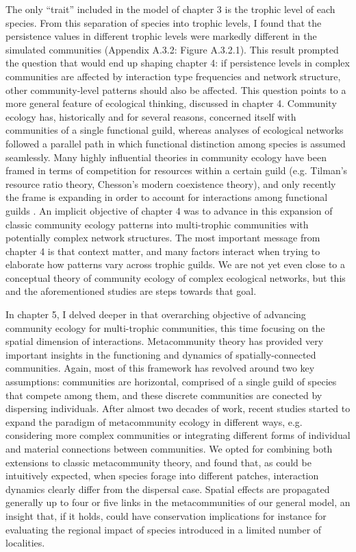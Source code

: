 The only ``trait'' included in the model of chapter 3 is the trophic level of each species. From this separation of species into trophic levels, I found that the persistence values in different trophic levels were markedly different in the simulated communities (Appendix A.3.2: Figure A.3.2.1). This result prompted the question that would end up shaping chapter 4: if persistence levels in complex communities are affected by interaction type frequencies and network structure, other community-level patterns should also be affected. This question points to a more general feature of ecological thinking, discussed in chapter 4. Community ecology has, historically and for several reasons, concerned itself with communities of a single functional guild, whereas analyses of ecological networks followed a parallel path in which functional distinction among species is assumed seamlessly. Many highly influential theories in community ecology have been framed in terms of competition for resources within a certain guild (e.g. Tilman's resource ratio theory, Chesson's modern coexistence theory), and only recently the frame is expanding in order to account for interactions among functional guilds \citep{Chesson2008,Godoy2018, Seibold2018}. An implicit objective of chapter 4 was to advance in this expansion of classic community ecology patterns into multi-trophic communities with potentially complex network structures. The most important message from chapter 4 is that context matter, and many factors interact when trying to elaborate how patterns vary across trophic guilds. We are not yet even close to a conceptual theory of community ecology of complex ecological networks, but this and the aforementioned studies are steps towards that goal.

In chapter 5, I delved deeper in that overarching objective of advancing community ecology for multi-trophic communities, this time focusing on the spatial dimension of interactions. Metacommunity theory has provided very important insights in the functioning and dynamics of spatially-connected communities. Again, most of this framework has revolved around two key assumptions: communities are horizontal, comprised of a single guild of species that compete among them, and these discrete communities are conected by dispersing individuals. After almost two decades of work, recent studies started to expand the paradigm of metacommunity ecology in different ways, e.g. considering more complex communities or integrating different forms of individual and material connections between communities. We opted for combining both extensions to classic metacommunity theory, and found that, as could be intuitively expected, when species forage into different patches, interaction dynamics clearly differ from the dispersal case. Spatial effects are propagated generally up to four or five links in the metacommunities of our general model, an insight that, if it holds, could have conservation implications for instance for evaluating the regional impact of species introduced in a limited number of localities.

